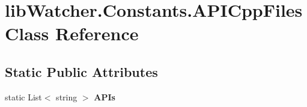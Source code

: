 \hypertarget{classlib_watcher_1_1_constants_1_1_a_p_i_cpp_files}{\section{lib\+Watcher.\+Constants.\+A\+P\+I\+Cpp\+Files Class Reference}
\label{classlib_watcher_1_1_constants_1_1_a_p_i_cpp_files}
}
\subsection*{Static Public Attributes}
\begin{DoxyCompactItemize}
\item 
static List$<$ string $>$ {\bfseries A\+P\+Is}
\end{DoxyCompactItemize}
